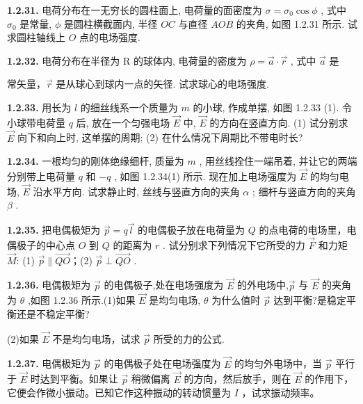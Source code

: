 \begin{center}
\end{center}


\vfill

\newpage
\textbf{1.2.31.} 电荷分布在一无穷长的圆柱面上, 电荷量的面密度为 $\sigma = \sigma_0\cos \phi$ , 式中 $\sigma_0$ 是常量, $\phi$ 是圆柱横截面内, 半径 $OC$ 与直径 $AOB$ 的夹角, 如图 1.2.31 所示. 试求圆柱轴线上 $O$ 点的电场强度.

\vfill

\textbf{1.2.32.} 电荷分布在半径为 R 的球体内, 电荷量的密度为 $\rho = \vec{a} \cdot \vec{r}$ , 式中 $\vec{a}$ 是


常矢量，$\vec{r}$ 是从球心到球内一点的矢径. 试求球心的电场强度.

\vfill

\newpage
\textbf{1.2.33.} 用长为 $l$ 的细丝线系一个质量为 $m$ 的小球, 作成单摆, 如图 1.2.33 (1). 令小球带电荷量 $q$ 后, 放在一个匀强电场 $\vec{E}$ 中, $\vec{E}$ 的方向在竖直方向. (1) 试分别求 $\vec{E}$ 向下和向上时, 这单摆的周期; (2) 在什么情况下周期比不带电时长?

\vfill

\textbf{1.2.34.} 一根均匀的刚体绝缘细杆, 质量为 $m$ , 用丝线拴住一端吊着, 并让它的两端分别带上电荷量 $q$ 和 $-q$ , 如图 1.2.34(1) 所示. 现在加上电场强度为 $\vec{E}$ 的均匀电场, $\vec{E}$ 沿水平方向. 试求静止时, 丝线与竖直方向的夹角 $\alpha$ ; 细杆与竖直方向的夹角 $\beta$ .

\vfill

\newpage
\textbf{1.2.35.} 把电偶极矩为 $\vec{p} = q\vec{l}$ 的电偶极子放在电荷量为 $Q$ 的点电荷的电场里，电偶极子的中心点 $O$ 到 $Q$ 的距离为 $r$ . 试分别求下列情况下它所受的力 $\vec{F}$ 和力矩 $\vec{M}$: (1) $\vec{p} \parallel \vec{QO}$；(2) $\vec{p} \perp \vec{QO}$ .

\vfill

\textbf{1.2.36.} 电偶极矩为 $\vec{p}$ 的电偶极子,处在电场强度为 $\vec{E}$ 的外电场中,$\vec{p}$ 与 $\vec{E}$ 的夹角为 $\theta$ ,如图 1.2.36 所示.(1)如果 $\vec{E}$ 是均匀电场, $\theta$ 为什么值时 $\vec{p}$ 达到平衡?是稳定平衡还是不稳定平衡?


(2)如果 $\vec{E}$ 不是均匀电场，试求 $\vec{p}$ 所受的力的公式.

\begin{center}
\end{center}

\vfill

\newpage
\textbf{1.2.37.} 电偶极矩为 $\vec{p}$ 的电偶极子处在电场强度为 $\vec{E}$ 的均匀外电场中，当 $\vec{p}$ 平行于 $\vec{E}$ 时达到平衡。如果让 $\vec{p}$ 稍微偏离 $\vec{E}$ 的方向，然后放手，则在 $\vec{E}$ 的作用下，它便会作微小振动。已知它作这种振动的转动惯量为 $I$ ，试求振动频率。

